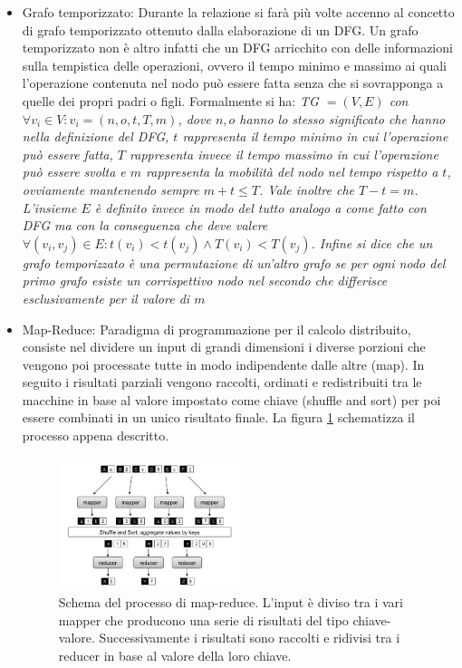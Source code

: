 \documentclass[]{IEEEtran}
\begin{document}
\begin{itemize}
	\item Grafo temporizzato: Durante la relazione si farà più volte accenno al concetto di grafo temporizzato ottenuto dalla elaborazione di un DFG. Un grafo temporizzato non è altro infatti che un DFG arricchito con delle informazioni sulla tempistica delle operazioni, ovvero il tempo minimo e massimo ai quali l'operazione contenuta nel nodo può essere fatta senza che si sovrapponga a quelle dei propri padri o figli. Formalmente si ha:
	\it{TG} \normalfont $=(V,E)$ con $\forall v_i\in V : v_i = (n,o,t,T,m)$, dove $n,o$ hanno lo stesso significato che hanno nella definizione del DFG, $t$ rappresenta il tempo \emph{minimo} in cui l'operazione può essere fatta, $T$ rappresenta invece il tempo \emph{massimo} in cui l'operazione può essere svolta e $m$ rappresenta la mobilità del nodo nel tempo rispetto a $t$, ovviamente mantenendo sempre $m+t\le T$. Vale inoltre che $T - t = m$. L'insieme $E$ è definito invece in modo del tutto analogo a come fatto con DFG ma con la conseguenza che deve valere $\forall (v_i,v_j) \in E : t(v_i)<t(v_j) \land T(v_i)<T(v_j)$.
	Infine si dice che un grafo temporizzato è una \emph{permutazione} di un'altro grafo se per ogni nodo del primo grafo esiste un corrispettivo nodo nel secondo che differisce esclusivamente per il valore di $m$
	
	\item Map-Reduce\cite{MAPRED}: Paradigma di programmazione per il calcolo distribuito, consiste nel dividere un input di grandi dimensioni i diverse porzioni che vengono poi processate tutte in modo indipendente dalle altre (map). In seguito i risultati parziali vengono raccolti, ordinati e redistribuiti tra le macchine in base al valore impostato come chiave (shuffle and sort) per poi essere combinati in un unico risultato finale. La figura \ref{mapred} schematizza il processo appena descritto.
	\begin{figure}[htp]
		\centering
		\includegraphics[width=0.5\textwidth]{images/mapred.png}
		\caption{Schema del processo di map-reduce. L'input è diviso tra i vari mapper che producono una serie di risultati del tipo chiave-valore. Successivamente i risultati sono raccolti e ridivisi tra i reducer in base al valore della loro chiave.}
		\label{mapred}
	\end{figure}
	

\end{itemize}
\end{document}
